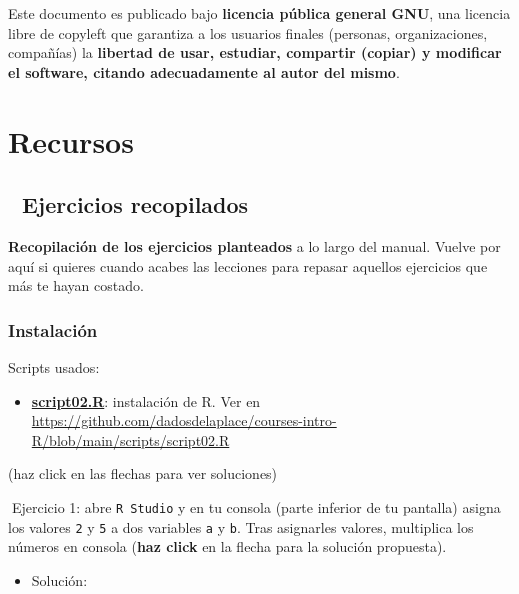 \documentclass[11pt,]{book}
\providecommand{\tightlist}{%
  \setlength{\itemsep}{0pt}\setlength{\parskip}{0pt}}
\begin{document}
Este documento es publicado bajo \textbf{licencia pública general GNU}, una licencia libre de copyleft que garantiza a los usuarios finales (personas, organizaciones, compañías) la \textbf{libertad de usar, estudiar, compartir (copiar) y modificar el software, citando adecuadamente al autor del mismo}.

\hypertarget{part-recursos}{%
\part{Recursos}\label{part-recursos}}

\hypertarget{ejercicios-recopilados}{%
\chapter*{📝 Ejercicios recopilados}\label{ejercicios-recopilados}}


\textbf{Recopilación de los ejercicios planteados} a lo largo del manual. Vuelve por aquí si quieres cuando acabes las lecciones para repasar aquellos ejercicios que más te hayan costado.

\hypertarget{instalaciuxf3n}{%
\section*{Instalación}\label{instalaciuxf3n}}


\begin{blackbox}

Scripts usados:

\begin{itemize}
\tightlist
\item
  \href{https://github.com/dadosdelaplace/courses-intro-R/blob/main/scripts/script02.R}{\textbf{script02.R}}: instalación de R. Ver en \url{https://github.com/dadosdelaplace/courses-intro-R/blob/main/scripts/script02.R}
\end{itemize}


\end{blackbox}

(haz click en las flechas para ver soluciones)

📝Ejercicio 1: abre \texttt{R\ Studio} y en tu consola (parte inferior de tu pantalla) asigna los valores \texttt{2} y \texttt{5} a dos variables \texttt{a} y \texttt{b}. Tras asignarles valores, multiplica los números en consola (\textbf{haz click} en la flecha para la solución propuesta).

\begin{itemize}
\tightlist
\item
  Solución:
\end{itemize}
\end{document}
